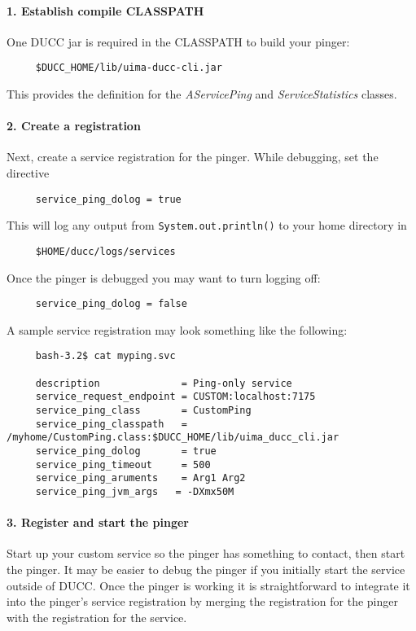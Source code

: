      \paragraph{1. Establish compile CLASSPATH} One DUCC jar is required in the CLASSPATH to build your pinger:
\begin{verbatim}
     $DUCC_HOME/lib/uima-ducc-cli.jar
\end{verbatim}      
      This provides the definition for the {\em AServicePing} and {\em ServiceStatistics} classes.

      \paragraph{2. Create a registration}Next, create a service registration for the pinger.  While
      debugging, set the directive
\begin{verbatim}
     service_ping_dolog = true
\end{verbatim}
      This will log any output from  {\tt System.out.println()} to your home directory in
\begin{verbatim}
     $HOME/ducc/logs/services
\end{verbatim}

      Once the pinger is debugged you may want to turn logging off:
\begin{verbatim}
     service_ping_dolog = false
\end{verbatim}
      
      A sample service registration may look something like the following:
\begin{verbatim}
     bash-3.2$ cat myping.svc

     description              = Ping-only service
     service_request_endpoint = CUSTOM:localhost:7175
     service_ping_class       = CustomPing
     service_ping_classpath   = /myhome/CustomPing.class:$DUCC_HOME/lib/uima_ducc_cli.jar
     service_ping_dolog       = true
     service_ping_timeout     = 500
     service_ping_aruments    = Arg1 Arg2
     service_ping_jvm_args   = -DXmx50M
\end{verbatim}
       
      \paragraph{3. Register and start the pinger} Start up your custom service so the pinger has something to contact, then start
      the pinger.  It may be easier to debug the pinger if you initially start the service outside of DUCC. Once
      the pinger is working it is straightforward to integrate it into the pinger's service registration by merging
      the registration for the pinger with the registration for the service.


